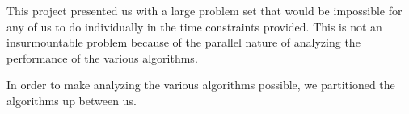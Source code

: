 This project presented us with a large problem set that would be impossible for
any of us to do individually in the time constraints provided. This is not an
insurmountable problem because of the parallel nature of analyzing the
performance of the various algorithms. 

In order to make analyzing the various algorithms possible, we partitioned the
algorithms up between us. 

